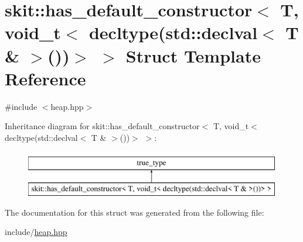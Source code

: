 \hypertarget{structskit_1_1has__default__constructor_3_01T_00_01void__t_3_01decltype_07std_1_1declval_3_01T_01_6_01_4_07_08_08_4_01_4}{}\section{skit\+:\+:has\+\_\+default\+\_\+constructor$<$ T, void\+\_\+t$<$ decltype(std\+:\+:declval$<$ T \& $>$())$>$ $>$ Struct Template Reference}
\label{structskit_1_1has__default__constructor_3_01T_00_01void__t_3_01decltype_07std_1_1declval_3_01T_01_6_01_4_07_08_08_4_01_4}


{\ttfamily \#include $<$heap.\+hpp$>$}

Inheritance diagram for skit\+:\+:has\+\_\+default\+\_\+constructor$<$ T, void\+\_\+t$<$ decltype(std\+:\+:declval$<$ T \& $>$())$>$ $>$\+:\begin{figure}[H]
\begin{center}
\leavevmode
\includegraphics[height=2.000000cm]{structskit_1_1has__default__constructor_3_01T_00_01void__t_3_01decltype_07std_1_1declval_3_01T_01_6_01_4_07_08_08_4_01_4}
\end{center}
\end{figure}


The documentation for this struct was generated from the following file\+:\begin{DoxyCompactItemize}
\item 
include/\hyperlink{heap_8hpp}{heap.\+hpp}\end{DoxyCompactItemize}
